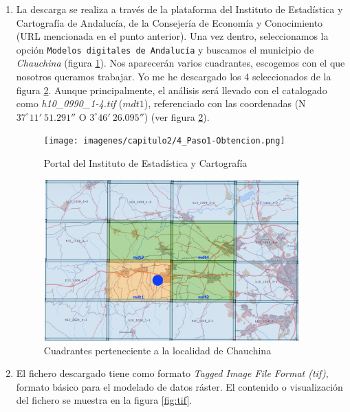 \begin{enumerate}
	\item La descarga se realiza a través de la plataforma del Instituto de Estadística y Cartografía de Andalucía, de la Consejería de Economía y Conocimiento (URL mencionada en el punto anterior). Una vez dentro, seleccionamos la opción \texttt{Modelos digitales de Andalucía} y buscamos el municipio de \textit{Chauchina} (figura \ref{fig:portal-instituto1}). Nos aparecerán varios cuadrantes, escogemos con el que nosotros queramos trabajar. Yo me he descargado los 4 seleccionados de la figura \ref{fig:portal-instituto2}. Aunque principalmente, el análisis será llevado con el catalogado como \textit{h10\_0990\_1-4.tif} ($mdt1$), referenciado con las coordenadas (N $37^{\circ} 11'\ 51.291''$	O $3^{\circ} 46'\ 26.095''$) (ver figura \ref{fig:portal-instituto2}).
	
	\begin{figure}[H]
		\centering
		\texttt{[image: imagenes/capitulo2/4\_Paso1-Obtencion.png]}
		\caption{Portal del Instituto de Estadística y Cartografía}
		\label{fig:portal-instituto1}
	\end{figure}
	
	\begin{figure}[H]
		\centering
		\includegraphics[height=6.2cm]{imagenes/capitulo2/4_Paso2-Obtencion1.png}
		\caption{Cuadrantes perteneciente a la localidad de Chauchina}
		\label{fig:portal-instituto2}
	\end{figure}
	
	\item El fichero descargado tiene como formato \textit{Tagged Image File Format (tif)}, formato básico para el modelado de datos ráster. El contenido o visualización del fichero se muestra en la figura \ref{fig:tif}.
	

\end{enumerate}
